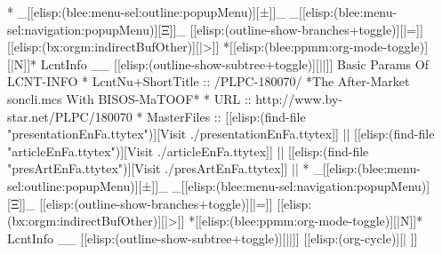 \begin{whenOrg}
*  _[[elisp:(blee:menu-sel:outline:popupMenu)][±]]_ _[[elisp:(blee:menu-sel:navigation:popupMenu)][Ξ]]_ [[elisp:(outline-show-branches+toggle)][|=]] [[elisp:(bx:orgm:indirectBufOther)][|>]] *[[elisp:(blee:ppmm:org-mode-toggle)][|N]]*  LcntInfo _{_ [[elisp:(outline-show-subtree+toggle)][||]] Basic Params Of LCNT-INFO
*     LcntNu+ShortTitle     :: /PLPC-180070/  *The After-Market soncli.mcs With BISOS-MaTOOF*
*     URL                   :: http://www.by-star.net/PLPC/180070
*     MasterFiles           :: [[elisp:(find-file "presentationEnFa.ttytex")][Visit ./presentationEnFa.ttytex]] || [[elisp:(find-file "articleEnFa.ttytex")][Visit ./articleEnFa.ttytex]] || [[elisp:(find-file "presArtEnFa.ttytex")][Visit ./presArtEnFa.ttytex]] ||
*  _[[elisp:(blee:menu-sel:outline:popupMenu)][±]]_ _[[elisp:(blee:menu-sel:navigation:popupMenu)][Ξ]]_ [[elisp:(outline-show-branches+toggle)][|=]] [[elisp:(bx:orgm:indirectBufOther)][|>]] *[[elisp:(blee:ppmm:org-mode-toggle)][|N]]*  LcntInfo _}_ [[elisp:(outline-show-subtree+toggle)][||]]  [[elisp:(org-cycle)][| ]]
\end{whenOrg}

